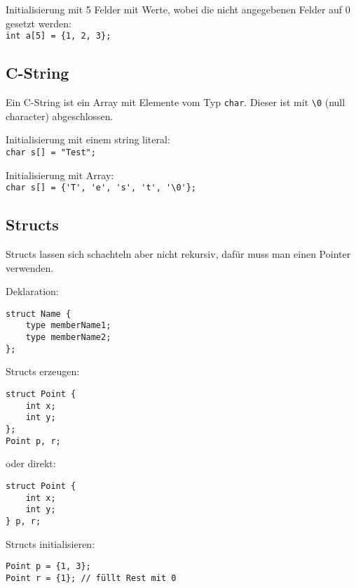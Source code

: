 \documentclass{article}
\newenvironment{code}
	{\begin{shaded}\vspace{-2.2mm}} 
	{\vspace{-5.0mm}\end{shaded}}
\begin{document}
\begin{multicols*}{3}
			Initialisierung mit 5 Felder mit Werte, wobei die nicht angegebenen Felder auf 0 gesetzt werden: \\
			\lstinline!int a[5] = {1, 2, 3};!
		\subsection{C-String} %
			Ein C-String ist ein Array mit Elemente vom Typ \lstinline!char!. Dieser ist mit \lstinline!\0! (null character) abgeschlossen.
			
			Initialisierung mit einem string literal: \\
			\lstinline!char s[] = "Test";!
			
			Initialisierung mit Array: \\
			\lstinline!char s[] = {'T', 'e', 's', 't', '\0'};!
		\subsection{Structs} %
			Structs lassen sich schachteln aber nicht rekursiv, dafür muss man einen Pointer verwenden.
			
			Deklaration:
			\begin{code}
				\begin{lstlisting}[style=list]
struct Name {
	type memberName1;
	type memberName2;
};
				\end{lstlisting}
			\end{code}
			
			Structs erzeugen:
			\begin{code}
				\begin{lstlisting}[style=list]
struct Point {
	int x;
	int y;
};
Point p, r;
				\end{lstlisting}
			\end{code}
			oder direkt:
			\begin{code}
				\begin{lstlisting}[style=list]
struct Point {
	int x;
	int y;
} p, r;
				\end{lstlisting}
			\end{code}
			
			Structs initialisieren:
			\begin{code}
				\begin{lstlisting}[style=list]
Point p = {1, 3};
Point r = {1}; // füllt Rest mit 0
				\end{lstlisting}
			\end{code}

\end{multicols*}
\end{document}
